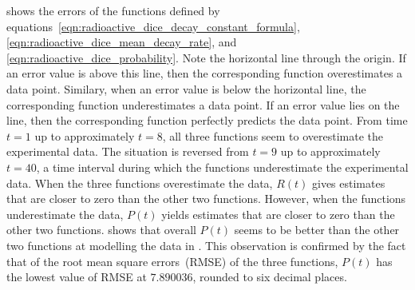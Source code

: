 \documentclass[a4paper,oneside,12pt]{article}
\begin{document}
\begin{problem}
{\begin{solution}
 shows the errors of the functions
defined by
equations~\eqref{eqn:radioactive_dice_decay_constant_formula},
\eqref{eqn:radioactive_dice_mean_decay_rate}, and
\eqref{eqn:radioactive_dice_probability}.  Note the horizontal line
through the origin.  If an error value is above this line, then the
corresponding function overestimates a data point.  Similary, when an
error value is below the horizontal line, the corresponding function
underestimates a data point.  If an error value lies on the line, then
the corresponding function perfectly predicts the data point.  From
time $t = 1$ up to approximately $t = 8$, all three functions seem to
overestimate the experimental data.  The situation is reversed from
$t = 9$ up to approximately $t = 40$, a time interval during which the
functions underestimate the experimental data.  When the three
functions overestimate the data, $R(t)$ gives estimates that are
closer to zero than the other two functions.  However, when the
functions underestimate the data, $P(t)$ yields estimates that are
closer to zero than the other two functions.
 shows that overall $P(t)$ seems
to be better than the other two functions at modelling the data in
.  This observation is confirmed by the
fact that of the root mean square errors~(RMSE) of the three
functions, $P(t)$ has the lowest value of RMSE at $7.890036$, rounded
to six decimal places.
\end{solution}
}{}

\begin{table}[!htbp]
\centering

\caption{%
  The radioactive decay of a sample of $4.0291$ grams of aluminium.
  The sample was neutron activated for $30$ minutes.  Then a Geiger
  counter was used to measure the number of remaining radioactive
  isotopes after the listed numbers of seconds.  The experiment was
  performed by Steven Sahyun of the University of Wisconsin at
  Whitewater, USA on $13$-th January~$2005$.
}
\label{tab:aluminium_radioactive_decay}
\end{table}


\end{problem}
\end{document}
